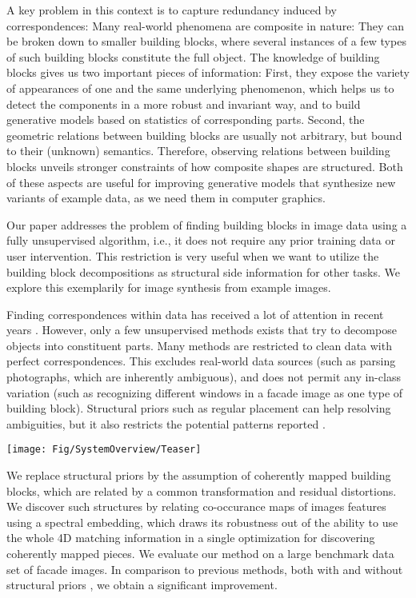 \documentclass{acmtog}
\begin{document}
A key problem in this context is to capture redundancy induced by correspondences: Many real-world phenomena are composite in nature: They can be broken down to smaller building blocks, where several instances of a few types of such building blocks constitute the full object. The knowledge of building blocks gives us two important pieces of information: First, they expose the variety of appearances of one and the same underlying phenomenon, which helps us to detect the components in a more robust and invariant way, and to build generative models based on statistics of corresponding parts. Second, the geometric relations between building blocks are usually not arbitrary, but bound to their (unknown) semantics. Therefore, observing relations between building blocks unveils stronger constraints of how composite shapes are structured. Both of these aspects are useful for improving generative models that synthesize new variants of example data, as we need them in computer graphics.

Our paper addresses the problem of finding building blocks in image data using a fully unsupervised algorithm, i.e., it does not require any prior training data or user intervention. This restriction is very useful when we want to utilize the building block decompositions as structural side information for other tasks. We explore this exemplarily for image synthesis from example images.

Finding correspondences within data has received a lot of attention in recent years \cite{Mitra2012}. However, only a few unsupervised methods exists that try to decompose objects into constituent parts. Many methods are restricted to clean data with perfect correspondences. This excludes real-world data sources (such as parsing photographs, which are inherently ambiguous), and does not permit any in-class variation (such as recognizing different windows in a facade image as one type of building block). Structural priors such as regular placement can help resolving ambiguities, but it also restricts the potential patterns reported \cite{Wu2010DL}. 

\begin{figure*}[t!]
  \centering
  \texttt{[image: Fig/SystemOverview/Teaser]}
  \caption{...} 
	\label{fig:Teaser}
\end{figure*}

We replace structural priors by the assumption of coherently mapped building blocks, which are related by a common transformation and residual distortions. We discover such structures by relating co-occurance maps of images features using a spectral embedding, which draws its robustness out of the ability to use the whole 4D matching information in a single optimization for discovering coherently mapped pieces. We evaluate our method on a large benchmark data set of facade images. In comparison to previous methods, both with \cite{Wu2010DL} and without structural priors \cite{LIPMANsig2010,Liu2013GRASP}, we obtain a significant improvement.
\end{document}
